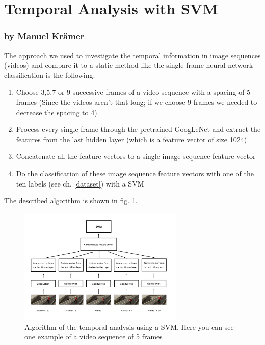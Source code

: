 \documentclass[11pt]{report}
\begin{document}
\section{Temporal Analysis with SVM}
\label{TempAnalysis_SVM}
\subsubsection{by Manuel Krämer}
The approach we used to investigate the temporal information in image sequences (videos) and compare it to a static method like the single frame neural network classification is the following:

\begin{enumerate} 
\item Choose 3,5,7 or 9 successive frames of a video sequence with a spacing of 5 frames (Since the videos aren't that long; if we choose 9 frames we needed to decrease the spacing to 4)
\item Process every single frame through the pretrained GoogLeNet and extract the features from the last hidden layer (which is a feature vector of size 1024)
\item Concatenate all the feature vectors to a single image sequence feature vector
\item Do the classification of these image sequence feature vectors with one of the ten labels (see ch. \ref{dataset}) with a SVM
\end{enumerate}

The described algorithm is shown in fig. \ref{fig_svm}.

\begin{figure}
  \centering
  \includegraphics[width=0.7\textwidth]{Illustration_SVM.png}
  \caption{Algorithm of the temporal analysis using a SVM. Here you can see one example of a video sequence of 5 frames}
  \label{fig_svm}
\end{figure}
\end{document}
